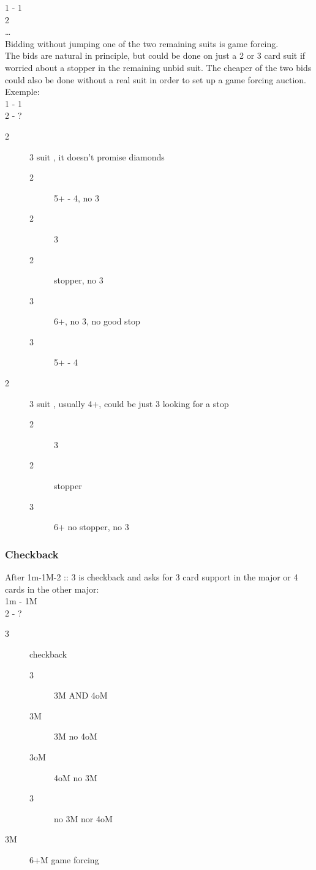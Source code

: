 \documentclass[11pt]{article}
\begin{document}
1 - 1\\
2\\
…\\

Bidding without jumping one of the two remaining suits is game forcing. \\
The bids are natural in principle, but could be done on just a 2 or 3 card suit if worried about a stopper in the remaining unbid suit. The cheaper of the two bids could also be done without a real suit in order to set up a game forcing auction.\\
Exemple:\\
1 - 1\\
2 - ?
\begin{description}
\item[{2}] 3 suit , it doesn’t promise diamonds
\begin{description}
\item[{2}] 5+ - 4, no 3
\item[{2}] 3
\item[{2}] stopper, no 3
\item[{3}] 6+, no 3, no good stop
\item[{3}] 5+ - 4
\end{description}
\item[{2}] 3 suit , usually 4+, could be just 3 looking for a stop
\begin{description}
\item[{2}] 3
\item[{2}] stopper
\item[{3}] 6+ no stopper, no 3
\end{description}
\end{description}
\subsubsection*{Checkback}
\label{sec:org0101f18}

After 1m-1M-2 :: 3 is checkback and asks for 3 card support in the major or 4 cards in the other major:\\
1m - 1M\\
2 - ?
\begin{description}
\item[{3}] checkback
\begin{description}
\item[{3}] 3M AND 4oM
\item[{3M}] 3M no 4oM
\item[{3oM}] 4oM no 3M
\item[{3}] no 3M nor 4oM
\end{description}
\item[{3M}] 6+M game forcing
\end{description}
\end{document}
